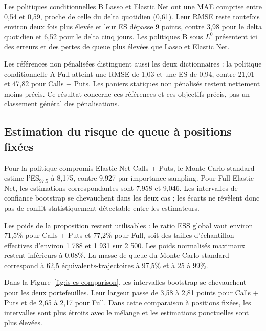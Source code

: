 Les politiques conditionnelles B Lasso et Elastic Net ont une MAE comprise entre
0,54 et 0,59, proche de celle du delta quotidien (0,61). Leur RMSE reste toutefois
environ deux fois plus élevée et leur ES dépasse 9 points, contre 3,98 pour le
delta quotidien et 6,52 pour le delta cinq jours. Les politiques B sous $L^0$
présentent ici des erreurs et des pertes de queue plus élevées que Lasso et Elastic Net.

Les références non pénalisées distinguent aussi les deux dictionnaires : la
politique conditionnelle A Full atteint une RMSE de 1,03 et une ES de 0,94,
contre 21,01 et 47,82 pour Calls + Puts. Les paniers statiques non pénalisés
restent nettement moins précis. Ce résultat concerne ces références et ces
objectifs précis, pas un classement général des pénalisations.

\subsection{Estimation du risque de queue à positions fixées}

Pour la politique compromis Elastic Net Calls + Puts, le Monte Carlo standard estime l'ES$_{97.5}$ à 8,175, contre 9,927 par importance sampling. Pour Full Elastic Net, les estimations correspondantes sont 7,958 et 9,046. Les intervalles de confiance bootstrap se chevauchent dans les deux cas ; les écarts ne révèlent donc pas de conflit statistiquement détectable entre les estimateurs.

Les poids de la proposition restent utilisables : le ratio ESS global vaut environ 71,5\% pour Calls + Puts et 77,2\% pour Full, soit des tailles d'échantillon effectives d'environ 1 788 et 1 931 sur 2 500. Les poids normalisés maximaux restent inférieurs à 0,08\%. La masse de queue du Monte Carlo standard correspond à 62,5 équivalents-trajectoires à 97,5\% et à 25 à 99\%.


Dans la Figure~\ref{fig:is-es-comparison}, les intervalles bootstrap se chevauchent pour les deux portefeuilles. Leur largeur passe de 3,58 à 2,81 points pour Calls + Puts et de 2,65 à 2,17 pour Full. Dans cette comparaison à positions fixées, les intervalles sont plus étroits avec le mélange et les estimations ponctuelles sont plus élevées.

